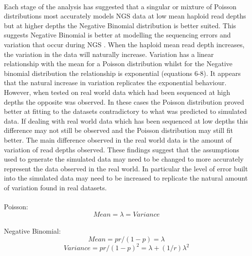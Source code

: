 \documentclass[11pt]{article}
\begin{document}
\paragraph{}Each stage of the analysis has suggested that a singular or mixture of Poisson distributions most accurately models NGS data at low mean haploid read depths but at higher depths the Negative Binomial distribution is better suited. This suggests Negative Binomial is better at modelling the sequencing errors and variation that occur during NGS \autocite{Robasky2014}. When the haploid mean read depth increases, the variation in the data will naturally increase. Variation has a linear relationship with the mean for a Poisson  distribution whilst for the Negative binomial distribution the relationship is exponential (equations 6-8). It appears that the natural increase in variation replicates the exponential behaviour. However, when tested on real world data which had been sequenced at high depths the opposite was observed. In these cases the Poisson distribution proved better at fitting to the datasets contradictory to what was predicted to simulated data. If dealing with real world data which has been sequenced at low depths this difference may not still be observed and the Poisson distribution may still fit better. The main difference observed in the real world data is the amount of variation of read depths observed. These findings suggest that the assumptions used to generate the simulated data may need to be changed to more accurately represent the data observed in the real world. In particular the level of error built into the simulated data may need to be increased to replicate the natural amount of variation found in real datasets.   
\paragraph{}
Poisson: 
\begin{equation}
Mean = \lambda = Variance
\end{equation}
\paragraph{}
Negative Binomial: 
\begin{equation}
Mean = pr/(1-p) = \lambda
\end{equation}
\begin{equation} 
Variance = pr/(1-p)^2 = \lambda + (1/r)\lambda^2
\end{equation} 
\end{document}
